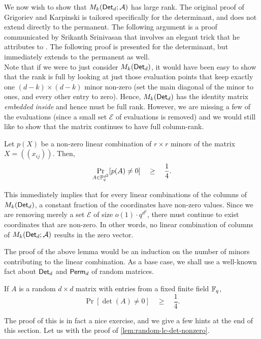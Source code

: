 We now wish to show that $M_k(\operatorname{\mathsf{Det}}_d;\mathcal{A})$ has large rank. 
The
original proof of Grigoriev and Karpinski is tailored specifically for
the determinant, and does not extend directly to the permanent. 
The
following argument is a proof communicated by Srikanth Srinivasan
\cite{Srikanth13} that involves an elegant trick that he attributes to
\cite{Koutis08}. 
The following proof is presented for the determinant,
but immediately extends to the permanent as well. \\


Note that if we were to just consider $M_k(\operatorname{\mathsf{Det}}_d)$, it would have
been easy to show that the rank is full by looking at just those
evaluation points that keep exactly one $(d-k)\times (d-k)$ minor
non-zero (set the main diagonal of the minor to ones, and every other
entry to zero). 
Hence, $M_k(\operatorname{\mathsf{Det}}_d)$ has the identity matrix
\emph{embedded inside} and hence must be full rank. 
However, we are
missing a few of the evaluations (since a small set $\mathcal{E}$ of
evaluations is removed) and we would still like to show that the
matrix continues to have full column-rank.

\begin{lemma}\label{lem:random-lc-det-nonzero}
  Let $p(X)$ be a non-zero linear combination of $r\times r$
  minors of the matrix $X = (\!(x_{ij})\!)$. 
Then, 
  $$
  \Pr_{A\in \mathbb{F}_q^{d^2}}[p(A) \neq 0] \quad \geq \quad \frac{1}{4}.
  $$
\end{lemma}

This immediately implies that for every linear combinations of the
columns of $M_k(\operatorname{\mathsf{Det}}_d)$, a constant fraction of the coordinates have
non-zero values. 
Since we are removing merely a set $\mathcal{E}$ of
size $o(1) \cdot q^{d^2}$, there must continue to exist coordinates that
are non-zero. 
In other words, no linear combination of columns of
$M_k(\operatorname{\mathsf{Det}}_d;\mathcal{A})$ results in the zero vector.


The proof of the above lemma would be an induction on the number of
minors contributing to the linear combination. 
As a base case, we
shall use a well-known fact about $\operatorname{\mathsf{Det}}_d$ and $\operatorname{\mathsf{Perm}}_d$ of random
matrices.

\begin{proposition}\label{prop:random-det-nonzero}
  If $A$ is a random $d\times d$ matrix with entries from a fixed
  finite field $\mathbb{F}_q$, 
$$
\Pr[\det(A) \neq 0] \quad\geq\quad \frac{1}{4}.
$$
\end{proposition}

The proof of this is in fact a nice exercise, and we give a few hints
at the end of this section. 
Let us with the proof of
\autoref{lem:random-lc-det-nonzero}.

